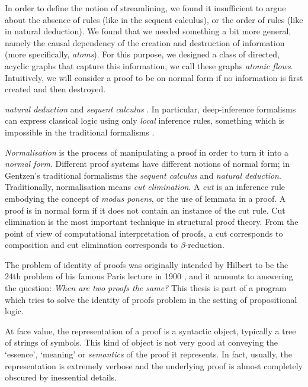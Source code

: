 In order to define the notion of streamlining, we found it insufficient to argue about the absence of rules (like in the sequent calculus), or the order of rules (like in natural deduction). We found that we needed something a bit more general, namely the causal dependency of the creation and destruction of information (more specifically, \emph{atoms}). For this purpose, we designed a class of directed, acyclic graphs that capture this information, we call these graphs \emph{atomic flows}. Intuitively, we will consider a proof to be on normal form if no information is first created and then destroyed.

\emph{natural deduction} and \emph{sequent calculus} \cite{Gent:69:Investig:xi}. In particular, deep-inference formalisms can express classical logic using only \emph{local} \cite{BrunTiu:01:A-Local-:mz} inference rules, something which is impossible in the traditional formalisms \cite{Brun:03:Two-Rest:mn}.



\emph{Normalisation} is the process of manipulating a proof in order to turn it into a \emph{normal form}. Different proof systems have different notions of normal form; in Gentzen's traditional formalisms the \emph{sequent calculus} and \emph{natural deduction}. Traditionally, normalisation means \emph{cut elimination}. A \emph{cut} is an inference rule embodying the concept of \emph{modus ponens}, or the use of lemmata in a proof. A proof is in normal form if it does not contain an instance of the cut rule. Cut elimination is the most important technique in structural proof theory. From the point of view of computational interpretation of proofs, a cut corresponds to composition and cut elimination corresponds to $\beta$-reduction.

The problem of identity of proofs was originally intended by Hilbert to be the 24th problem of his famous Paris lecture in 1900 \cite{Thie:03:Hilberts:yu}, and it amounts to answering the question: \emph{When are two proofs the same?} This thesis is part of a program which tries to solve the identity of proofs problem in the setting of propositional logic.

At face value, the representation of a proof is a syntactic object, typically a tree of strings of symbols. This kind of object is not very good at conveying the `essence', `meaning' or \emph{semantics} of the proof it represents. In fact, usually, the representation is extremely verbose and the underlying proof is almost completely obscured by inessential details.


